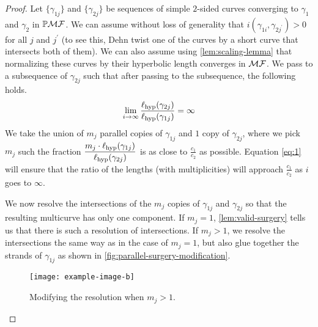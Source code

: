 \documentclass[12pt, reqno]{amsart}
\begin{document}
\begin{proof}
  Let $\{\gamma_{1j}\}$ and $\{ \gamma_{2j}\}$ be sequences of simple $2$-sided curves converging to $\gamma_1$ and $\gamma_2$ in $\mathbb{P}\mathcal{MF}$.
  We can assume without loss of generality that $i(\gamma_{1i}, \gamma_{2j^{\prime}}) > 0$ for all $j$ and $j^{\prime}$ (to see this, Dehn twist one of the curves by a short curve that intersects both of them).
  We can also assume using \autoref{lem:scaling-lemma} that normalizing these curves by their hyperbolic length converges in $\mathcal{MF}$.
  We pass to a subsequence of $\gamma_{2j}$ such that after passing to the subsequence,
  the following holds.
  \begin{align}
    \label{eq:1}
    \lim_{i \to \infty} \frac{\ell_{\mathrm{hyp}}(\gamma_{2j})}{\ell_{\mathrm{hyp}}(\gamma_{1j})} = \infty
  \end{align}
  We take the union of $m_j$ parallel copies of $\gamma_{1j}$ and $1$ copy of $\gamma_{2j}$, where we pick $m_j$ such the fraction $\displaystyle \frac{m_j \cdot \ell_{\mathrm{hyp}}(\gamma_{1j})}{\ell_{\mathrm{hyp}}(\gamma_{2j})}$ is as close to $\displaystyle \frac{c_1}{c_2}$ as possible.
  Equation \eqref{eq:1} will ensure that the ratio of the lengths (with multiplicities) will approach $\displaystyle \frac{c_1}{c_2}$ as $i$ goes to $\infty$.

  We now resolve the intersections of the $m_j$ copies of $\gamma_{1j}$ and $\gamma_{2j}$ so that the resulting multicurve has only one component.
  If $m_j = 1$, \autoref{lem:valid-surgery} tells us that there is such a resolution of intersections.
  If $m_j > 1$, we resolve the intersections the same way as in the case of $m_j = 1$, but also glue together the strands of $\gamma_{1j}$ as shown in \autoref{fig:parallel-surgery-modification}.
  \begin{figure}[h]
    \centering
    \texttt{[image: example-image-b]}
    \caption{Modifying the resolution when $m_j > 1$.}
    \label{fig:parallel-surgery-modification}
  \end{figure}


\end{proof}
\end{document}
